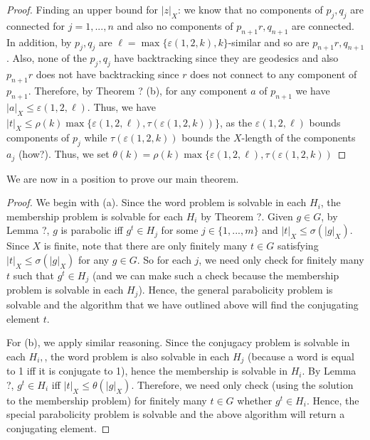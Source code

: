 \documentclass[12pt]{article}
\newcommand{\vs}{\vskip10pt}
\begin{document}
\begin{proof}
		Finding an upper bound for $\vert z \vert_X$: we know that no components of $p_j, q_j$ are connected for $j =1,...,n$ and also no components of $p_{n+1}r, q_{n+1}$ are connected. In addition, by $p_j, q_j$ are $\ell = \max \{\varepsilon(1,2,k), k\}$-similar and so are $p_{n+1}r, q_{n+1}$. Also, none of the $p_j, q_j$ have backtracking since they are geodesics and also $p_{n+1}r$ does not have backtracking since $r$ does not connect to any component of $p_{n+1}$. Therefore, by Theorem ? (b), for any component $a$ of $p_{n+1}$ we have $\vert a \vert_X \leq \varepsilon(1,2,\ell)$. Thus, we have $\vert t \vert_X \leq \rho(k) \max \{\varepsilon(1,2,\ell), \tau(\varepsilon(1,2,k))\}$, as the $\varepsilon(1,2,\ell)$ bounds components of $p_j$ while $\tau(\varepsilon(1,2,k))$ bounds the $X$-length of the components $a_j$ (how?). Thus, we set $\theta(k) = \rho(k) \max \{\varepsilon(1,2,\ell), \tau(\varepsilon(1,2,k))$
		
	\end{proof}

	We are now in a position to prove our main theorem. 
	
	\begin{proof}
		
		We begin with (a). Since the word problem is solvable in each $H_i$, the membership problem is solvable for each $H_i$ by Theorem ?. Given $g \in G$, by Lemma ?, $g$ is parabolic iff $g^t \in H_j$ for some $j \in \{1,...,m\}$ and $\vert t \vert_X \leq \sigma(\vert g \vert_X)$. Since $X$ is finite, note that there are only finitely many $t \in G$ satisfying $\vert t \vert_X \leq \sigma(\vert g \vert_X)$ for any $g \in G$. So for each $j$, we need only check for finitely many $t$ such that $g^t \in H_j$ (and we can make such a check because the membership problem is solvable in each $H_j$). Hence, the general parabolicity problem is solvable and the algorithm that we have outlined above will find the conjugating element $t$. 
		
		\vs 
		
		For (b), we apply similar reasoning. Since the conjugacy problem is solvable in each $H_i, $, the word problem is also solvable in each $H_j$ (because a word is equal to 1 iff it is conjugate to 1), hence the membership is solvable in $H_i$. By Lemma ?, $g^t \in H_i$ iff $\vert t \vert_X \leq \theta(\vert g \vert_X)$. Therefore, we need only check (using the solution to the membership problem) for finitely many $t \in G$ whether $g^t \in H_i$. Hence, the special parabolicity problem is solvable and the above algorithm will return a conjugating element.
		
	\end{proof}
	
\end{document}
